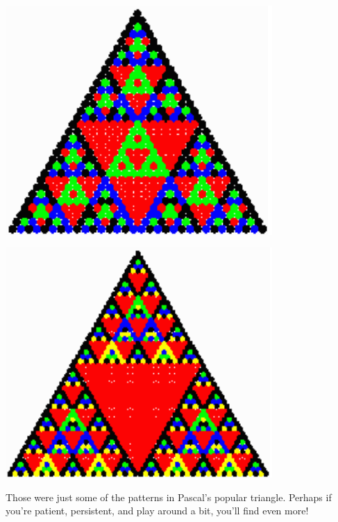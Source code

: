 \documentclass{article}
\begin{document}
\begin{center}
	\includegraphics[width=4in,scale=0.35]{images/pascal4.png}
\end{center}

\begin{center}
	\includegraphics[width=4in,scale=0.35]{images/pascal5.png}
\end{center}


Those were just some of the patterns in Pascal's popular triangle. Perhaps if you're patient, persistent, and play around a bit, you'll find even more!
\end{document}
